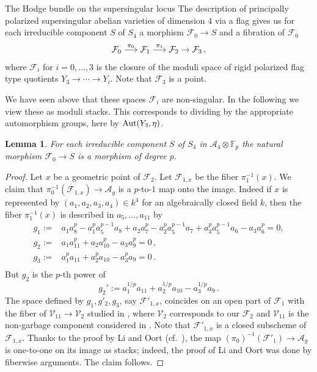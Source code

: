 \documentclass[11pt]{amsart}
\numberwithin{equation}{section}
\newcommand{\FF}{\mathbb F}
\newcommand\langepijl[1]{\buildrel {#1} \over \longrightarrow}
\newtheorem{lemma}[theorem]{Lemma}
\theoremstyle{definition}
\theoremstyle{remark}
\begin{document}
\begin{section}{The Hodge bundle on the supersingular locus}\label{Hodge-bundle}
The description of principally polarized supersingular
abelian varieties of dimension $4$
via a flag gives us for each irreducible component $S$ of $S_4$
a morphism $\mathcal{F}_0 \to S$ and a fibration of $\mathcal{F}_0$
$$
\mathcal{F}_0 \langepijl{\pi_0} \mathcal{F}_1 \langepijl{\pi_1} 
\mathcal{F}_2 \to \mathcal{F}_3\, ,
$$
where $\mathcal{F}_i$ for $i=0,\ldots,3$ is the closure of the moduli space of
rigid polarized flag type quotients $Y_3 \to \cdots \to Y_i$.
Note that $\mathcal{F}_3$ is a point. 

We have seen above that these spaces $\mathcal{F}_i$ are non-singular.
In the following we view these as moduli stacks. This corresponds to dividing
by the appropriate automorphism groups, here by ${\rm Aut}(Y_3,\eta)$.

\begin{lemma}\label{degree-p} For each irreducible component $S$ of $S_4$ in $\mathcal{A}_4\otimes {\FF}_p$ 
the natural morphism $\mathcal{F}_0\to S$ is a morphism of degree $p$.
\end{lemma}
\begin{proof}
Let $x$ be a geometric point of ${\mathcal F_2}$.
Let ${\mathcal F}_{1,x}$ be the fiber $\pi_1^{-1}(x)$.
We claim that $\pi_0^{-1}({\mathcal F}_{1,x}) \to \mathcal A_g$ is a $p$-to-$1$ map onto the image.
Indeed if $x$ is represented by $(a_1,a_2,a_3,a_4)\in k^4$ for an algebraically closed field $k$, then
the fiber $\pi_1^{-1}(x)$ is described in $a_5,\ldots,a_{11}$ by
$$
\begin{aligned}
g_1:=& a_1a_8^p-a_1^pa_5^{p-1}a_8+a_2a_7^p-a_2^pa_5^{p-1}a_7 +a_3^pa_5^{p-1}a_6-a_3a_6^p=0, \\
g_2:=& a_1a_{11}^p+a_2a_{10}^p-a_3a_9^p=0\, ,  \\
g_3:=& a_1^pa_{11}+a_2^pa_{10}-a_3^pa_{9}=0\, .\\
\end{aligned}
$$
But $g_2$ is the $p$-th power of
\[
g_2' := a_1^{1/p} a_{11} + a_2^{1/p} a_{10} - a_3^{1/p}a_9\, .
\]
The space defined by $g_1, g'_2, g_3$, say ${\mathcal F}'_{1,x}$, coincides on an open part of
$\mathcal{F}_1$ with the fiber 
of ${\mathcal V}_{11} \to {\mathcal V}_2$ studied in \cite[9.7]{L-O},
where ${\mathcal V}_2$ corresponds to our ${\mathcal F}_2$ and ${\mathcal V}_{11}$ is the non-garbage component considered in \cite[9.7]{L-O}.
Note that ${\mathcal F}'_{1,x}$ is a closed subscheme of ${\mathcal F}_{1,x}$.
Thanks to the proof by Li and Oort (cf.~\cite[7.11]{L-O}), the map $(\pi_0)^{-1}({\mathcal F}'_1) \to {\mathcal A}_g$ is one-to-one on its image as stacks; indeed,  the proof of Li and Oort was done by fiberwise arguments. The claim follows.
\end{proof}



\end{section}
\end{document}
